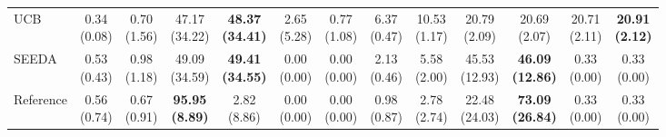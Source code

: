 {\begin{tabular}{l|cccccc|cccccc}
UCB & \makecell{0.34 \\ (0.08)} & \makecell{0.70 \\ (1.56)} & {\cellcolor[HTML]{C8E6C9}} \makecell{47.17 \\ (34.22)} & \bfseries \makecell{48.37 \\ (34.41)} & \makecell{2.65 \\ (5.28)} & \makecell{0.77 \\ (1.08)} & \makecell{6.37 \\ (0.47)} & \makecell{10.53 \\ (1.17)} & {\cellcolor[HTML]{C8E6C9}} \makecell{20.79 \\ (2.09)} & \makecell{20.69 \\ (2.07)} & \makecell{20.71 \\ (2.11)} & \bfseries \makecell{20.91 \\ (2.12)} \\
SEEDA & \makecell{0.53 \\ (0.43)} & \makecell{0.98 \\ (1.18)} & {\cellcolor[HTML]{C8E6C9}} \makecell{49.09 \\ (34.59)} & \bfseries \makecell{49.41 \\ (34.55)} & \makecell{0.00 \\ (0.00)} & \makecell{0.00 \\ (0.00)} & \makecell{2.13 \\ (0.46)} & \makecell{5.58 \\ (2.00)} & {\cellcolor[HTML]{C8E6C9}} \makecell{45.53 \\ (12.93)} & \bfseries \makecell{46.09 \\ (12.86)} & \makecell{0.33 \\ (0.00)} & \makecell{0.33 \\ (0.00)} \\
Reference & \makecell{0.56 \\ (0.74)} & \makecell{0.67 \\ (0.91)} & {\cellcolor[HTML]{C8E6C9}} \bfseries \makecell{95.95 \\ (8.89)} & \makecell{2.82 \\ (8.86)} & \makecell{0.00 \\ (0.00)} & \makecell{0.00 \\ (0.00)} & \makecell{0.98 \\ (0.87)} & \makecell{2.78 \\ (2.74)} & {\cellcolor[HTML]{C8E6C9}} \makecell{22.48 \\ (24.03)} & \bfseries \makecell{73.09 \\ (26.84)} & \makecell{0.33 \\ (0.00)} & \makecell{0.33 \\ (0.00)} \\

\end{tabular}}
